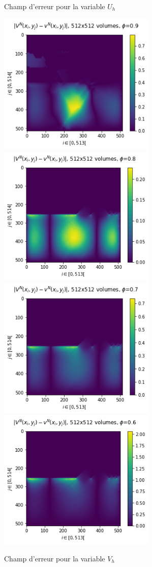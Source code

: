 \begin{figure}[htp]
    \caption{Champ d'erreur pour la variable $U_h$}
\end{figure}

\begin{figure}[htp]
    \centering
    \includegraphics[width=7.5cm]{Images/bicouche/0.9/Figure 2021-11-18 231238 (58).png}
    \includegraphics[width=7.5cm]{Images/bicouche/0.8/Figure 2021-11-18 231238 (50).png}
    \includegraphics[width=7.5cm]{Images/bicouche/0.7/Figure 2021-11-18 231238 (42).png}
    \includegraphics[width=7.5cm]{Images/bicouche/0.6/Figure 2021-11-18 231238 (34).png}
    \caption{Champ d'erreur pour la variable $V_h$}
\end{figure}

